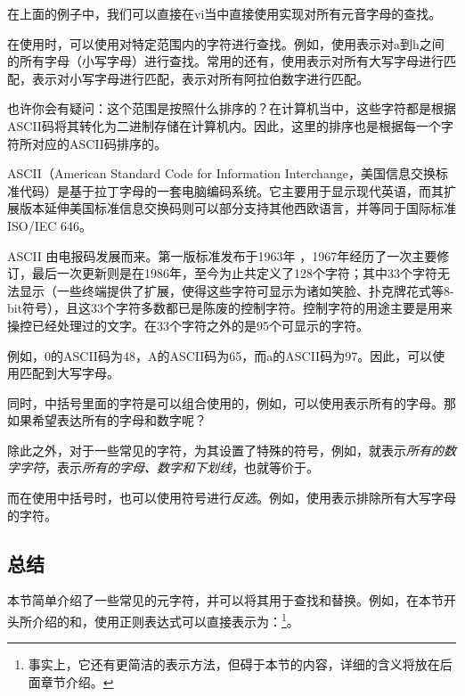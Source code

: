 在上面的例子中，我们可以直接在vi当中直接使用\code{/[aeiou]}实现对所有元音字母的查找。

在使用\code{[]}时，可以使用\code{-}对特定范围内的字符进行查找。例如，使用\code{[a-h]}表示对a到h之间的所有字母（小写字母）进行查找。常用的还有，使用\code{[A-Z]}表示对所有大写字母进行匹配，\code{[a-z]}表示对小写字母进行匹配，\code{[0-9]}表示对所有阿拉伯数字进行匹配。

\begin{extend}
    也许你会有疑问：这个范围是按照什么排序的？在计算机当中，这些字符都是根据ASCII码将其转化为二进制存储在计算机内。因此，这里的排序也是根据每一个字符所对应的ASCII码排序的。

    ASCII（American Standard Code for Information Interchange，美国信息交换标准代码）是基于拉丁字母的一套电脑编码系统。它主要用于显示现代英语，而其扩展版本延伸美国标准信息交换码则可以部分支持其他西欧语言，并等同于国际标准ISO/IEC 646。

    ASCII 由电报码发展而来。第一版标准发布于1963年 ，1967年经历了一次主要修订，最后一次更新则是在1986年，至今为止共定义了128个字符；其中33个字符无法显示（一些终端提供了扩展，使得这些字符可显示为诸如笑脸、扑克牌花式等8-bit符号），且这33个字符多数都已是陈废的控制字符。控制字符的用途主要是用来操控已经处理过的文字。在33个字符之外的是95个可显示的字符。

    例如，0的ASCII码为48，A的ASCII码为65，而a的ASCII码为97。因此，可以使用\code{[0-a]}匹配到大写字母。
\end{extend}

同时，中括号里面的字符是可以组合使用的，例如，可以使用\code{[A-Za-z]}表示所有的字母。那如果希望表达所有的字母和数字呢？

\answer{\code{[A-Za-z0-9]}}

除此之外，对于一些常见的字符，为其设置了特殊的符号，例如，就表示\emph{所有的数字字符}，表示\emph{所有的字母、数字和下划线}，也就等价于\code{[A-Za-z0-9\_]}。

而在使用中括号时，也可以使用符号\code{\^}进行\emph{反选}。例如，使用\code{\^[A-Z]}表示排除所有大写字母的字符。

\subsection{总结}\label{subsec:初窥正则表达式-总结}

本节简单介绍了一些常见的元字符，并可以将其用于查找和替换。例如，在本节开头所介绍的和，使用正则表达式可以直接表示为：\footnote{事实上，它还有更简洁的表示方法，但碍于本节的内容，详细的含义将放在后面章节介绍。}。

